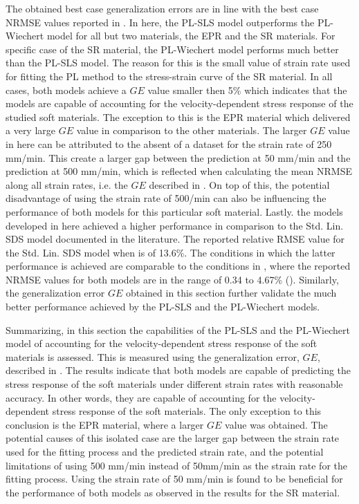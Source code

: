The obtained best case generalization errors are in line with the best case NRMSE values reported in . In here, the PL-SLS model outperforms the PL-Wiechert model for all but two materials, the EPR and the SR materials. For specific case of the SR material, the PL-Wiechert model performs much better than the PL-SLS model. The reason for this is the small value of strain rate used for fitting the PL method to the stress-strain curve of the SR material. In all cases, both models achieve a $GE$ value smaller then 5\% which indicates that the models are capable of accounting for the velocity-dependent stress response of the studied soft materials. The exception to this is the EPR material which delivered a very large $GE$ value in comparison to the other materials. The larger $GE$ value in here can be attributed to the absent of a dataset for the strain rate of 250 mm/min. This create a larger gap between the prediction at 50 mm/min and the prediction at 500 mm/min, which is reflected when calculating the mean NRMSE along all strain rates, i.e. the $GE$ described in . On top of this, the potential disadvantage of using the strain rate of 500/min can also be influencing the performance of both models for this particular soft material. Lastly. the models developed in here achieved a higher performance in comparison to the Std. Lin. SDS model documented in the literature. The reported relative RMSE value for the Std. Lin. SDS model when is of 13.6\%. The conditions in which the latter performance is achieved are comparable to the conditions in , where the reported NRMSE values for both models are in the range of 0.34 to 4.67\% (). Similarly, the generalization error $GE$ obtained in this section further validate the much better performance achieved by the PL-SLS and the PL-Wiechert models.

Summarizing, in this section the capabilities of the PL-SLS and the PL-Wiechert model of accounting for the velocity-dependent stress response of the soft materials is assessed. This is measured using the generalization error, $GE$, described in . The results indicate that both models are capable of predicting the stress response of the soft materials under different strain rates with reasonable accuracy. In other words, they are capable of accounting for the velocity-dependent stress response of the soft materials. The only exception to this conclusion is the EPR material, where a larger $GE$ value was obtained. The potential causes of this isolated case are the larger gap between the strain rate used for the fitting process and the predicted strain rate, and the potential limitations of using 500 mm/min instead of 50mm/min as the strain rate for the fitting process. Using the strain rate of 50 mm/min is found to be beneficial for the performance of both models as observed in the results for the SR material.

